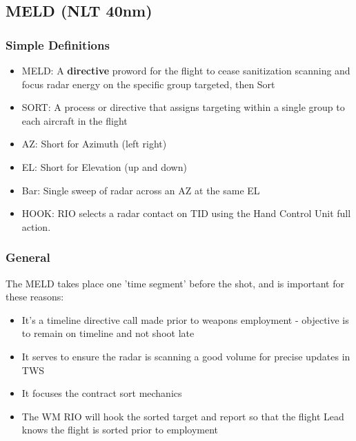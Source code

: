 \subsection{MELD (NLT 40nm)}

\subsubsection*{Simple Definitions}

\begin{itemize}

  \item MELD: A \textbf{directive} proword for the flight to cease sanitization
    scanning and focus radar energy on the specific group targeted, then Sort

  \item SORT: A process or directive that assigns targeting within a single
    group to each aircraft in the flight

  \item AZ: Short for Azimuth (left right)

  \item EL: Short for Elevation (up and down)

  \item Bar: Single sweep of radar across an AZ at the same EL

  \item HOOK: RIO selects a radar contact on TID using the Hand Control Unit
    full action.

\end{itemize}


\subsubsection*{General}

The MELD takes place one 'time segment' before the shot, and is important for
these reasons:

\begin{itemize}
  \item It's a timeline directive call made prior to weapons employment -
    objective is to remain on timeline and not shoot late

  \item It serves to ensure the radar is scanning a good volume for precise
    updates in TWS

  \item It focuses the contract sort mechanics

  \item The WM RIO will hook the sorted target and report so that the flight
    Lead knows the flight is sorted prior to employment

\end{itemize}

